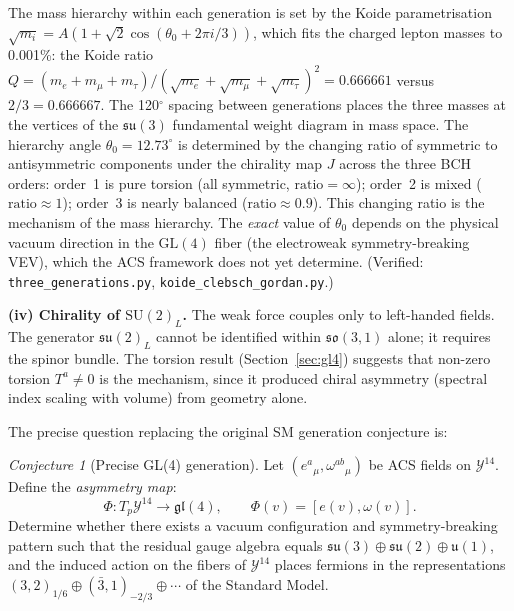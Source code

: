 \documentclass[11pt,a4paper]{article}
\theoremstyle{plain}
\theoremstyle{definition}
\theoremstyle{remark}
\newtheorem{conjecture}[theorem]{Conjecture}
\begin{document}
The mass hierarchy within each generation is set by the
Koide parametrisation $\sqrt{m_i} = A(1 + \sqrt{2}\cos(\theta_0 + 2\pi i/3))$,
which fits the charged lepton masses to 0.001\%:
the Koide ratio $Q = (m_e + m_\mu + m_\tau)/(\sqrt{m_e} + \sqrt{m_\mu} + \sqrt{m_\tau})^2 = 0.666661$ versus $2/3 = 0.666667$.
The 120$^\circ$ spacing between generations
places the three masses at the vertices of the $\mathfrak{su}(3)$
fundamental weight diagram in mass space.
The hierarchy angle $\theta_0 = 12.73^\circ$ is determined by
the changing ratio of symmetric to antisymmetric components
under the chirality map $J$ across the three BCH orders:
order~1 is pure torsion (all symmetric, $\mathrm{ratio} = \infty$);
order~2 is mixed ($\mathrm{ratio} \approx 1$);
order~3 is nearly balanced ($\mathrm{ratio} \approx 0.9$).
This changing ratio is the mechanism of the mass hierarchy.
The \emph{exact} value of $\theta_0$ depends on the physical
vacuum direction in the $\mathrm{GL}(4)$ fiber (the electroweak
symmetry-breaking VEV), which the ACS framework does not yet determine.
(Verified: \texttt{three\_generations.py}, \texttt{koide\_clebsch\_gordan.py}.)

\medskip
\noindent\textbf{(iv) Chirality of $\mathrm{SU}(2)_L$.}  
The weak force couples only to left-handed fields.  
The generator $\mathfrak{su}(2)_L$ cannot be identified within $\mathfrak{so}(3,1)$ 
alone; it requires the spinor bundle.  
The torsion result (Section~\ref{sec:gl4}) suggests that 
non-zero torsion $T^a \neq 0$ is the mechanism, 
since it produced chiral asymmetry (spectral index scaling with volume) 
from geometry alone.

\medskip

The precise question replacing the original SM generation conjecture is:

\begin{conjecture}[Precise GL(4) generation]\label{conj:gl4-precise}
Let $(e^a{}_\mu, \omega^{ab}{}_\mu)$ be ACS fields on $\mathcal{Y}^{14}$.  
Define the \emph{asymmetry map}:
\[
  \Phi: T_p\mathcal{Y}^{14} \to \mathfrak{gl}(4), \qquad
  \Phi(v) = [e(v), \omega(v)].
\]
Determine whether there exists a vacuum configuration and symmetry-breaking 
pattern such that the residual gauge algebra equals 
$\mathfrak{su}(3) \oplus \mathfrak{su}(2) \oplus \mathfrak{u}(1)$, 
and the induced action on the fibers of $\mathcal{Y}^{14}$ places fermions in 
the representations $(3,2)_{1/6} \oplus (\bar{3},1)_{-2/3} \oplus \cdots$ 
of the Standard Model.
\end{conjecture}
\end{document}
